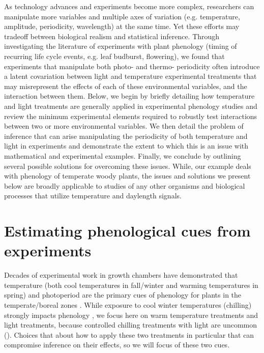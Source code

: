 \documentclass[11pt]{article}
\begin{document}
As technology advances and experiments become more complex, researchers can manipulate more variables and multiple axes of variation (e.g. temperature, amplitude, periodicity, wavelength) at the same time. Yet these efforts may tradeoff between biological realism and statistical inference. Through investigating the literature of experiments with plant phenology (timing of recurring life cycle events, e.g. leaf budburst, flowering), we found that experiments that manipulate both photo- and thermo- periodicity often introduce a latent covariation between light and temperature experimental treatments that may misrepresent the effects of each of these environmental variables, and the interaction between them. Below, we begin by briefly detailing how temperature and light treatments are generally applied in experimental phenology studies and review the minimum experimental elements required to robustly test interactions between two or more environmental variables. We then detail the problem of inference that can arise manipulating the periodicity of both temperature and light in experiments and demonstrate the extent to which this is an issue with mathematical and experimental examples. Finally, we conclude by outlining several possible solutions for overcoming these issues.  While, our example deals with phenology of temperate woody plants, the issues and solutions we present below are broadly applicable to studies of any other organisms and biological processes that utilize temperature and daylength signals. 

\section*{Estimating phenological cues from experiments}
Decades of experimental work in growth chambers have demonstrated that temperature (both cool temperatures in fall/winter and warming temperatures in spring) and photoperiod are the primary cues of phenology for plants in the temperate/boreal zones \citep{Ettinger:2020aa}. While exposure to cool winter temperatures (chilling) strongly impacts phenology \citep{Laube2014}, we focus here on warm temperature treatments and light treatments, because controlled chilling treatments with light are uncommon (\citep{limitingcues}). Choices that about how to apply these two treatments in particular that can compromise inference on their effects, so we will focus of these two cues.
\end{document}
